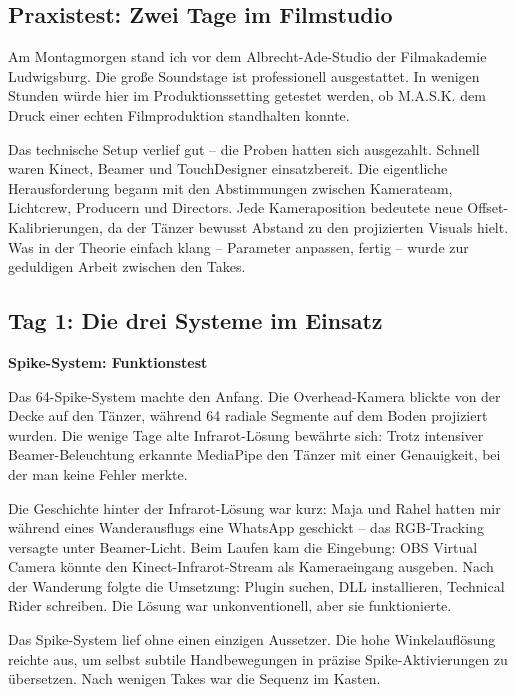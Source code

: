 \subsection{Praxistest: Zwei Tage im Filmstudio}

Am Montagmorgen stand ich vor dem Albrecht-Ade-Studio der Filmakademie Ludwigsburg. Die große Soundstage ist professionell ausgestattet. In wenigen Stunden würde hier im Produktionssetting getestet werden, ob M.A.S.K. dem Druck einer echten Filmproduktion standhalten konnte.


Das technische Setup verlief gut – die Proben hatten sich ausgezahlt. Schnell waren Kinect, Beamer und TouchDesigner einsatzbereit. Die eigentliche Herausforderung begann mit den Abstimmungen zwischen Kamerateam, Lichtcrew, Producern und Directors. Jede Kameraposition bedeutete neue Offset-Kalibrierungen, da der Tänzer bewusst Abstand zu den projizierten Visuals hielt. Was in der Theorie einfach klang – Parameter anpassen, fertig – wurde zur geduldigen Arbeit zwischen den Takes.


\clearpage
\subsection{Tag 1: Die drei Systeme im Einsatz}

\textbf{Spike-System: Funktionstest}

\raggedright Das 64-Spike-System machte den Anfang. Die Overhead-Kamera blickte von der Decke auf den Tänzer, während 64 radiale Segmente auf dem Boden projiziert wurden. Die wenige Tage alte Infrarot-Lösung bewährte sich: Trotz intensiver Beamer-Beleuchtung erkannte MediaPipe den Tänzer mit einer Genauigkeit, bei der man keine Fehler merkte.


Die Geschichte hinter der Infrarot-Lösung war kurz: Maja und Rahel hatten mir während eines Wanderausflugs eine WhatsApp geschickt – das RGB-Tracking versagte unter Beamer-Licht. Beim Laufen kam die Eingebung: OBS Virtual Camera könnte den Kinect-Infrarot-Stream als Kameraeingang ausgeben. Nach der Wanderung folgte die Umsetzung: Plugin suchen, DLL installieren, Technical Rider schreiben. Die Lösung war unkonventionell, aber sie funktionierte.



Das Spike-System lief ohne einen einzigen Aussetzer. Die hohe Winkelauflösung reichte aus, um selbst subtile Handbewegungen in präzise Spike-Aktivierungen zu übersetzen. Nach wenigen Takes war die Sequenz im Kasten.

